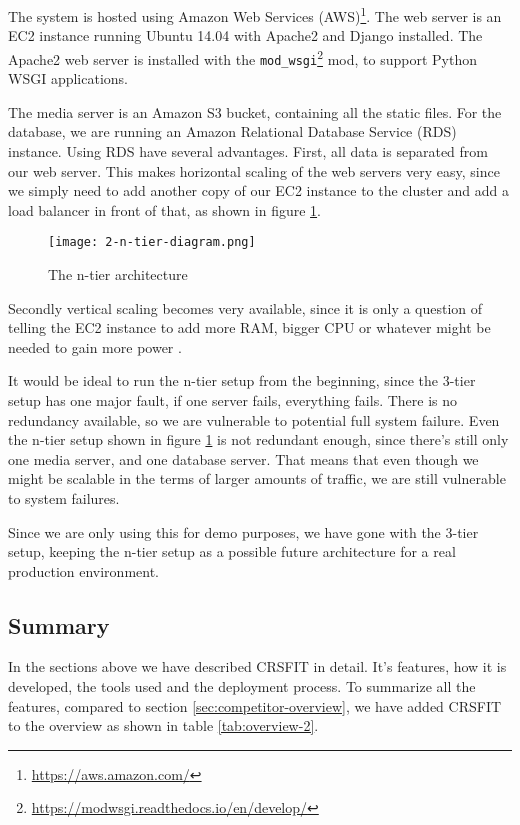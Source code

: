 The system is hosted using Amazon Web Services (AWS)\footnote{\url{https://aws.amazon.com/}}. The web server is an EC2 instance running Ubuntu 14.04 with Apache2 and Django installed. The Apache2 web server is installed with the \texttt{mod\_wsgi}\footnote{\url{https://modwsgi.readthedocs.io/en/develop/}} mod, to support Python WSGI applications.

The media server is an Amazon S3 bucket, containing all the static files. For the database, we are running an Amazon Relational Database Service (RDS) instance. Using RDS have several advantages. First, all data is separated from our web server. This makes horizontal scaling of the web servers very easy, since we simply need to add another copy of our EC2 instance  to the cluster and add a load balancer in front of that, as shown in figure \ref{fig:n-tier}.

\begin{figure}[H]
\capstart
	\centering
		\texttt{[image: 2-n-tier-diagram.png]}
	\caption[]{The n-tier architecture \label{fig:n-tier}}
\end{figure}

Secondly vertical scaling becomes very available, since it is only a question of telling the EC2 instance to add more RAM, bigger CPU or whatever might be needed to gain more power \cite[p.~204]{henderson2006building}. 

It would be ideal to run the n-tier setup from the beginning, since the 3-tier setup has one major fault, if one server fails, everything fails. There is no redundancy available, so we are vulnerable to potential full system failure. Even the n-tier setup shown in figure \ref{fig:n-tier} is not redundant enough, since there's still only one media server, and one database server. That means that even though we might be scalable in the terms of larger amounts of traffic, we are still vulnerable to system failures. 



Since we are only using this for demo purposes, we have gone with the 3-tier setup, keeping the n-tier setup as a possible future architecture for a real production environment.






\subsection{Summary}
In the sections above we have described CRSFIT in detail. It's features, how it is developed, the tools used and the deployment process. To summarize all the features, compared to section  \ref{sec:competitor-overview}, we have added CRSFIT to the overview as shown in table  \ref{tab:overview-2}.


